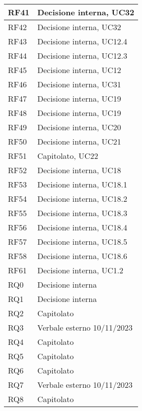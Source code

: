 \begin{center}
\begin{longtable}{|C{5cm}|C{5cm}|}
        \hline
        RF41 & Decisione interna, UC32 \\
        \hline
        RF42 & Decisione interna, UC32 \\
        \hline
        RF43 & Decisione interna, UC12.4 \\
        \hline
        RF44 & Decisione interna, UC12.3 \\
        \hline
        RF45 & Decisione interna, UC12 \\
        \hline
        RF46 & Decisione interna, UC31 \\
        \hline
        RF47 & Decisione interna, UC19 \\
        \hline
        RF48 & Decisione interna, UC19 \\
        \hline
        RF49 & Decisione interna, UC20 \\
        \hline
        RF50 & Decisione interna, UC21 \\
        \hline
        RF51 & Capitolato, UC22 \\
        \hline
        RF52 & Decisione interna, UC18 \\
        \hline
        RF53 & Decisione interna, UC18.1 \\
        \hline
        RF54 & Decisione interna, UC18.2 \\
        \hline
        RF55 & Decisione interna, UC18.3 \\
        \hline
        RF56 & Decisione interna, UC18.4 \\
        \hline
        RF57 & Decisione interna, UC18.5 \\
        \hline
        RF58 & Decisione interna, UC18.6 \\
        \hline
        RF61 & Decisione interna, UC1.2 \\
        \hline
        RQ0 & Decisione interna \\
        \hline
        RQ1 & Decisione interna \\
        \hline
        RQ2 & Capitolato \\
        \hline
        RQ3 & Verbale esterno 10/11/2023 \\
        \hline
        RQ4 & Capitolato \\
        \hline
        RQ5 & Capitolato \\
        \hline
        RQ6 & Capitolato \\
        \hline
        RQ7 & Verbale esterno 10/11/2023 \\
        \hline
        RQ8 & Capitolato \\

\end{longtable}
\end{center}
